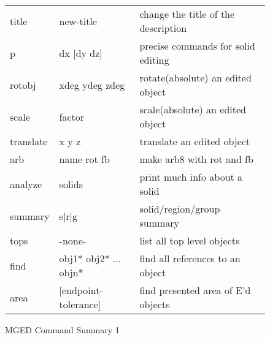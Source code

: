 \begin{figure}[tb]
\begin{tabular}{l l l}
  title	& new-title	& change the title of the description \\
  p	& dx [dy dz]	& precise commands for solid editing \\
  rotobj	& xdeg ydeg zdeg	& rotate(absolute) an edited object \\
  scale	& factor	& scale(absolute) an edited object \\
  translate	& x y z	& translate an edited object \\
  arb	& name rot fb	& make arb8 with rot and fb \\
  analyze	& solids	& print much info about a solid \\
  summary	& s|r|g	& solid/region/group summary \\
  tops	& -none-	& list all top level objects \\
  find	& obj1* obj2* ... objn*	& find all references to an object \\
  area	& [endpoint-tolerance]	& find presented area of E'd objects \\
\end{tabular}
\caption{MGED Command Summary 1 \label{cmd-summary} }
\end{figure}

